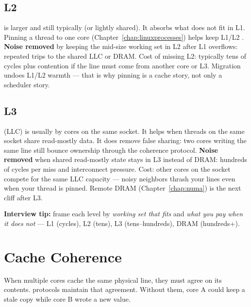 \subsection{L2}
\label{subsec:cache-l2}
 is larger and still typically  (or lightly shared). 
It absorbs what does not fit in L1. Pinning a thread to one core 
(Chapter~\ref{chap:linuxprocesses}) helps keep L1/L2 .
\newline
\textbf{Noise removed} by keeping the mid-size working set in L2 after L1 overflows: 
repeated trips to the shared LLC or DRAM. Cost of missing L2: typically tens of cycles 
plus contention if the line must come from another core or L3. Migration undoes L1/L2 warmth 
--- that is why pinning is a cache story, not only a scheduler story.

\subsection{L3}
\label{subsec:cache-l3}
 (LLC) is usually  by cores on the same socket. 
It helps when threads on the same socket share read-mostly data. 
It does  remove false sharing: two cores writing the same line 
still bounce ownership through the coherence protocol.
\newline
\textbf{Noise removed} when shared read-mostly state stays in L3 instead of DRAM: 
hundreds of cycles per miss and interconnect pressure. Cost: other cores on the socket 
compete for the same LLC capacity --- noisy neighbors thrash your lines even when your 
thread is pinned. Remote DRAM (Chapter~\ref{chap:numa}) is the next cliff after L3.
\par\noindent\textbf{Interview tip:} frame each level by \emph{working set that fits} and 
\emph{what you pay when it does not} --- L1 (cycles), L2 (tens), L3 (tens--hundreds), DRAM (hundreds+).

\section{Cache Coherence}
\label{sec:cache-coherence}
When multiple cores cache the same physical line, they must agree on its 
contents.  protocols maintain that agreement. 
Without them, core A could keep a stale copy while core B wrote a new value.

